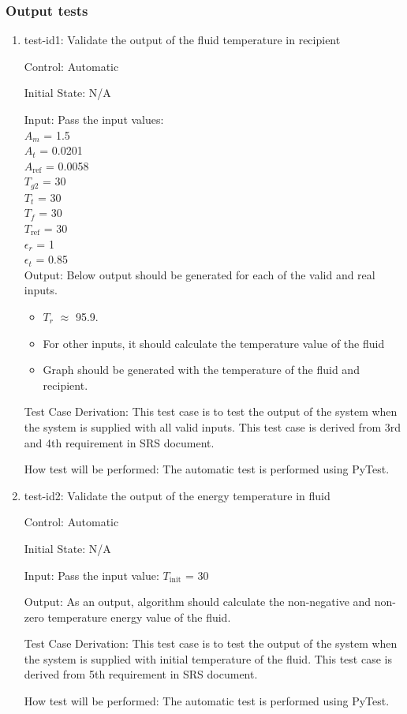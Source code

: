 \documentclass[12pt, titlepage]{article}
\begin{document}
\subsubsection{Output tests}
\label{output_functional_tests}
\begin{enumerate}

\item{test-id1: Validate the output of the fluid temperature in recipient  \\}

Control: Automatic 
					
Initial State: N/A
					
Input: Pass the input values: \\ 
       $A_m$ = 1.5 \\
       $A_t$ = 0.0201 \\
       $A_{\text{ref}}$ = 0.0058 \\
       $T_{g2}$ = 30 \\
       $T_t$ = 30 \\
       $T_f$ = 30 \\
       $T_\text{ref}$ = 30 \\ 
       $\epsilon_r$ = 1 \\
       $\epsilon_t$ = 0.85 \\
       
					
Output: Below output should be generated for each of the valid and real inputs. 
\begin{itemize}
    \item $T_r$ $\approx$ 95.9. 
    \item For other inputs, it should calculate the temperature value of the fluid 
    \item Graph should be generated with the temperature of the fluid and recipient.  
\end{itemize} 

Test Case Derivation: This test case is to test the output of the system when the system is supplied with all valid inputs. This test case is derived from 3rd and 4th requirement in SRS document.  
					
How test will be performed: The automatic test is performed using PyTest.  


\item{test-id2: Validate the output of the energy temperature in fluid  \\}

Control: Automatic 
					
Initial State: N/A
					
Input: Pass the input value: $T_\text{init}$ = 30 
					
Output: As an output, algorithm should calculate the non-negative and non-zero temperature energy value of the fluid.  

Test Case Derivation: This test case is to test the output of the system when the system is supplied with initial temperature of the fluid. This test case is derived from 5th requirement in SRS document.  
					
How test will be performed: The automatic test is performed using PyTest.  

\end{enumerate}   
\end{document}
